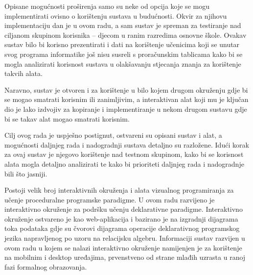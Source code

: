 \documentclass[times, utf8, diplomski, numeric]{fer}
\newcommand{\razmakp}{\vspace{18pt}}
\begin{document}
\razmakp

Opisane mogućnosti proširenja samo su neke od opcija koje se mogu implementirati ovisno o korištenju sustava u budućnosti.
Okvir za njihovu implementaciju dan je u ovom radu, a sam sustav je spreman za testiranje nad ciljanom skupinom korisnika -- djecom u ranim razredima osnovne škole.
Ovakav sustav bilo bi korisno prezentirati i dati na korištenje učenicima koji se unutar svog programa informatike još nisu susreli s proračunskim tablicama kako bi se mogla analizirati korisnost sustava u olakšavanju stjecanja znanja za korištenje takvih alata.

Naravno, sustav je otvoren i za korištenje u bilo kojem drugom okruženju gdje bi se mogao smatrati korisnim ili zanimljivim, a interaktivan alat koji mu je ključan dio je lako izdvojiv za kopiranje i implementiranje u nekom drugom sustavu gdje bi se takav alat mogao smatrati korisnim.

\razmakp

Cilj ovog rada je uspješno postignut, ostvareni su opisani sustav i alat, a mogućnosti daljnjeg rada i nadogradnji sustava detaljno su razložene.
Idući korak za ovaj sustav je njegovo korištenje nad testnom skupinom, kako bi se korisnost alata mogla detaljno analizirati te kako bi prioriteti daljnjeg rada i nadogradnje bili što jasniji.







\begin{sazetak}
Postoji velik broj interaktivnih okruženja i alata vizualnog programiranja za učenje proceduralne programske paradigme.
U ovom radu razvijeno je interaktivno okruženje za podršku učenju deklarativne paradigme.
Interaktivno okruženje ostvareno je kao web-aplikacija i bazirano je na izgradnji dijagrama toka podataka gdje su čvorovi dijagrama operacije deklarativnog programskog jezika napravljenog po uzoru na relacijsku algebru.
Informaciji sustav razvijen u ovom radu u kojem se nalazi interaktivno okruženje namijenjen je za korištenje na mobilnim i desktop uređajima, prvenstveno od strane mlađih uzrasta u ranoj fazi formalnog obrazovanja.


\end{sazetak}
\end{document}
